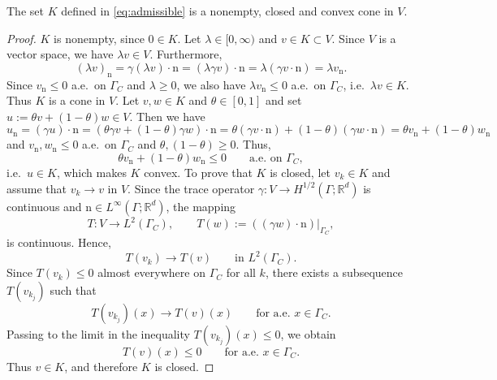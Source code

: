 \begin{proposition}\label{pr:K}
	The set $K$ defined in \ref{eq:admissible} is a nonempty, closed and convex cone in $V$.
\end{proposition}
\begin{proof}
	$K$ is nonempty, since $0\in K$. Let $\lambda\in[0,\infty)$ and $v\in K\subset V$. Since $V$ is a vector space, we have $\lambda v\in V$. Furthermore,
	\begin{equation*}
		(\lambda v)_\mathrm{n} = \gamma(\lambda v)\cdot \mathrm{n} = (\lambda\gamma v)\cdot \mathrm{n} = \lambda(\gamma v\cdot \mathrm{n}) = \lambda v_\mathrm{n}.
	\end{equation*}
	Since $v_\mathrm{n}\le 0$ a.e.\ on $\Gamma_C$ and $\lambda\ge 0$, we also have $\lambda v_\mathrm{n}\le 0$ a.e.\ on $\Gamma_C$, i.e.\ $\lambda v\in K$. Thus $K$ is a cone in $V$. Let $v,w\in K$ and $\theta\in[0,1]$ and set $u:= \theta v+(1-\theta)w\in V$. Then we have
	\begin{equation*}
		u_\mathrm{n} =(\gamma u)\cdot \mathrm{n} = (\theta\gamma v+(1-\theta)\gamma w)\cdot \mathrm{n} = \theta(\gamma v\cdot \mathrm{n})+(1-\theta)(\gamma w\cdot\mathrm{n}) = \theta v_\mathrm{n}+(1-\theta)w_\mathrm{n}
	\end{equation*}
	and $v_\mathrm{n},w_\mathrm{n}\le 0$ a.e.\ on $\Gamma_C$ and $\theta,(1-\theta)\ge 0$. Thus,
	\begin{equation*}
		\theta v_\mathrm{n}+(1-\theta)w_\mathrm{n}\le 0\qquad\text{a.e.\ on }\Gamma_C,
	\end{equation*}
	i.e.\ $u\in K$, which makes $K$ convex. To prove that $K$ is closed, let $v_k \in K$ and assume that $v_k \to v$ in $V$. Since the trace operator $\gamma : V \to H^{1/2}(\Gamma;\mathbb{R}^d)$ is continuous and $\mathrm{n} \in L^\infty(\Gamma;\mathbb{R}^d)$, the mapping
	\begin{equation*}
		T : V \to L^2(\Gamma_C), \qquad T(w) := ((\gamma w)\cdot \mathrm{n})|_{\Gamma_C},
	\end{equation*}
	is continuous. Hence,
	\begin{equation*}
		T(v_k) \to T(v) \qquad \text{in } L^2(\Gamma_C).
	\end{equation*}
	Since $T(v_k) \le 0$ almost everywhere on $\Gamma_C$ for all $k$, there exists a subsequence $T(v_{k_j})$ such that
	\begin{equation*}
		T(v_{k_j})(x) \to T(v)(x) \qquad \text{for a.e. } x \in \Gamma_C.
	\end{equation*}
	Passing to the limit in the inequality $T(v_{k_j})(x) \le 0$, we obtain
	\begin{equation*}
		T(v)(x) \le 0 \qquad \text{for a.e. } x \in \Gamma_C.
	\end{equation*}
	Thus $v \in K$, and therefore $K$ is closed.
\end{proof}

